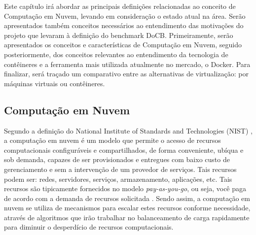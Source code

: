 \documentclass[twoside,english,brazilian]{UNISINOSartigo}
\begin{document}

Este capítulo irá abordar as principais definições relacionadas ao conceito de Computação em Nuvem, levando em consideração o estado atual na área. Serão apresentados também conceitos necessários ao entendimento das motivações do projeto que levaram à definição do benchmark DoCB. Primeiramente, serão apresentados os conceitos e características de Computação em Nuvem, seguido posteriormente, dos conceitos relevantes ao entendimento da tecnologia de contêineres e a ferramenta mais utilizada atualmente no mercado, o Docker. Para finalizar, será traçado um comparativo entre as alternativas de virtualização: por máquinas virtuais ou contêineres. 

\subsection{Computação em Nuvem}
\label{cloud}
Segundo a definição do National Institute of Standards and Technologies (NIST) \cite{Mell2012}, a computação em nuvem é um modelo que permite o acesso de recursos computacionais configuráveis e compartilhados, de forma conveniente, ubíqua e sob demanda, capazes de ser provisionados e entregues com baixo custo de gerenciamento e sem a intervenção de um provedor de serviços. Tais recursos podem ser: redes, servidores, serviços, armazenamento, aplicações, etc. Tais recursos são tipicamente fornecidos no modelo \textit{pay-as-you-go}, ou seja, você paga de acordo com a demanda de recursos solicitada \cite{Suleiman2012}. Sendo assim, a computação em nuvem se utiliza de mecanismos para escalar estes recursos conforme necessidade, através de algoritmos que irão trabalhar no balanceamento de carga rapidamente para diminuir o desperdício de recursos computacionais.
\end{document}
